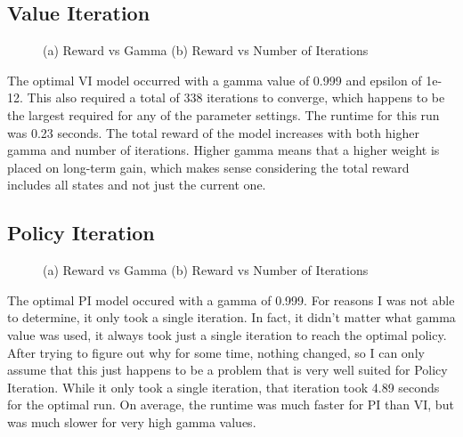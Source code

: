 \documentclass[
	letterpaper, %
]{mlreport}
\begin{document}
\subsection{Value Iteration}
\begin{figure}
	\centering
	\caption{(a) Reward vs Gamma (b) Reward vs Number of Iterations}
	\label{fig:fig2}
\end{figure}
The optimal VI model occurred with a gamma value of 0.999 and epsilon of 1e-12. This also required a total of 338 iterations to converge, which happens to be the largest required for any of the parameter settings. The runtime for this run was 0.23 seconds. The total reward of the model increases with both higher gamma and number of iterations. Higher gamma means that a higher weight is placed on long-term gain, which makes sense considering the total reward includes all states and not just the current one.

\subsection{Policy Iteration}
\begin{figure}
	\centering
	\caption{(a) Reward vs Gamma (b) Reward vs Number of Iterations}
	\label{fig:fig3}
\end{figure}
The optimal PI model occured with a gamma of 0.999. For reasons I was not able to determine, it only took a single iteration. In fact, it didn't matter what gamma value was used, it always took just a single iteration to reach the optimal policy. After trying to figure out why for some time, nothing changed, so I can only assume that this just happens to be a problem that is very well suited for Policy Iteration. While it only took a single iteration, that iteration took 4.89 seconds for the optimal run. On average, the runtime was much faster for PI than VI, but was much slower for very high gamma values.
\end{document}
